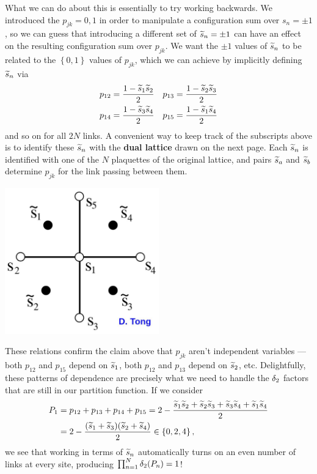 What we can do about this is essentially to try working backwards.
We introduced the $p_{jk} = 0, 1$ in order to manipulate a configuration sum over $s_n = \pm 1$, so we can guess that introducing a different set of $\widetilde s_n = \pm 1$ can have an effect on the resulting configuration sum over $p_{jk}$.
We want the $\pm 1$ values of $\widetilde s_n$ to be related to the $\left\{0, 1\right\}$ values of $p_{jk}$, which we can achieve by implicitly defining $\widetilde s_n$ via
\begin{align*}
  p_{12} & = \frac{1 - \widetilde s_1 \widetilde s_2}{2} &
  p_{13} & = \frac{1 - \widetilde s_2 \widetilde s_3}{2} \\
  p_{14} & = \frac{1 - \widetilde s_3 \widetilde s_4}{2} &
  p_{15} & = \frac{1 - \widetilde s_1 \widetilde s_4}{2}
\end{align*}
and so on for all $2N$ links.
A convenient way to keep track of the subscripts above is to identify these $\widetilde s_n$ with the \textbf{dual lattice} drawn on the next page.
Each $\widetilde s_n$ is identified with one of the $N$ plaquettes of the original lattice, and pairs $\widetilde s_a$ and $\widetilde s_b$ determine $p_{jk}$ for the link passing between them.

\begin{center}\includegraphics[width=0.5\textwidth]{figs/unit09_dual_lattice.pdf}\end{center}

These relations confirm the claim above that $p_{jk}$ aren't independent variables --- both $p_{12}$ and $p_{15}$ depend on $\widetilde s_1$, both $p_{12}$ and $p_{13}$ depend on $\widetilde s_2$, etc.
Delightfully, these patterns of dependence are precisely what we need to handle the $\delta_2$ factors that are still in our partition function.
If we consider
\begin{align*}
  P_1 & = p_{12} + p_{13} + p_{14} + p_{15} = 2 - \frac{\widetilde s_1 \widetilde s_2 + \widetilde s_2 \widetilde s_3 + \widetilde s_3 \widetilde s_4 + \widetilde s_1 \widetilde s_4}{2} \\
      & = 2 - \frac{(\widetilde s_1 + \widetilde s_3)(\widetilde s_2 + \widetilde s_4)}{2} \in \left\{0, 2, 4\right\},
\end{align*}
we see that working in terms of $\widetilde s_n$ automatically turns on an even number of links at every site, producing $\prod_{n = 1}^N \delta_2(P_n) = 1$!

